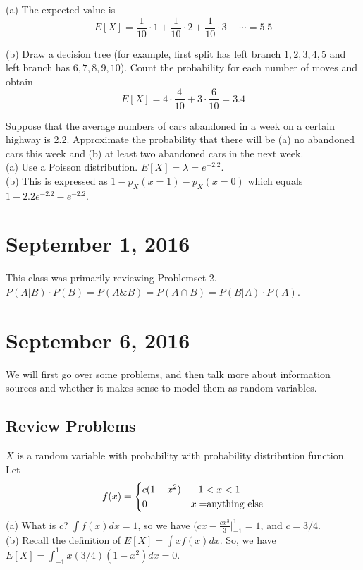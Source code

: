 \documentclass[11pt]{article}
\theoremstyle{definition}
\begin{document}
\noindent (a) The expected value is $$E[X] = \frac{1}{10} \cdot 1 + \frac{1}{10} \cdot 2 + \frac{1}{10} \cdot 3 + \cdots = 5.5$$ 

\noindent (b) Draw a decision tree (for example, first split has left branch $1,2,3,4,5$ and left branch has $6,7,8,9,10$). Count the probability for each number of moves and obtain $$E[X] = 4 \cdot \frac{4}{10} + 3 \cdot \frac{6}{10} = 3.4$$

\example Suppose that the average numbers of cars abandoned in a week on a certain highway is 2.2. Approximate the probability that there will be (a) no abandoned cars this week and (b) at least two abandoned cars in the next week. \\

\noindent (a) Use a Poisson distribution. $E[X] = \lambda = e^{-2.2}$. \\

\noindent (b) This is expressed as $1 - p_X(x = 1) - p_X(x = 0)$ which equals $1 - 2.2e^{-2.2} - e^{-2.2}$. 

\section{September 1, 2016}
This class was primarily reviewing Problemset 2. 
\theorem[Bayes] $P(A|B) \cdot P(B) = P(A \& B) = P(A \cap B) = P(B|A) \cdot P(A)$.

\section{September 6, 2016}
We will first go over some problems, and then talk more about information sources and whether it makes sense to model them as random variables. 
\subsection{Review Problems}
\example$X$ is a random variable with probability with probability distribution function. Let 
\begin{equation*}
f(x) = \begin{cases}
c(1-x^2) & -1 < x < 1\\
0 & x = $anything else$ \\
\end{cases}
\end{equation*}
(a) What is $c$? $\int f(x) dx = 1$, so we have $(cx - \frac{cx^3}{3}|_{-1}^1 = 1$, and $c = 3/4$. \\
(b) Recall the definition of $E[X] = \int xf(x) dx$. So, we have $E[X] = \int_{-1}^1 x (3/4) (1-x^2)dx = 0$. 
\end{document}
